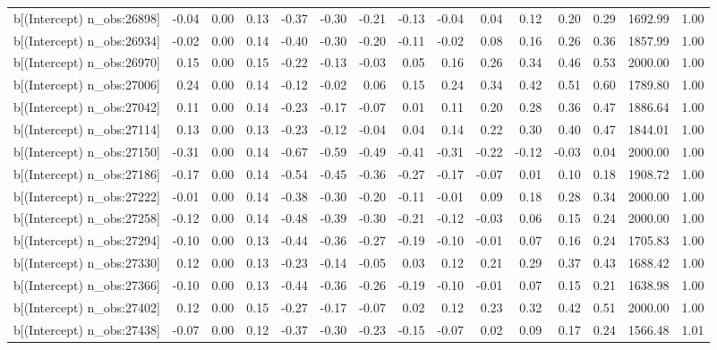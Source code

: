 \begin{table}[ht]
\begin{tabular}{rrrrrrrrrrrrrrr}
  b[(Intercept) n\_obs:26898] & -0.04 & 0.00 & 0.13 & -0.37 & -0.30 & -0.21 & -0.13 & -0.04 & 0.04 & 0.12 & 0.20 & 0.29 & 1692.99 & 1.00 \\ 
  b[(Intercept) n\_obs:26934] & -0.02 & 0.00 & 0.14 & -0.40 & -0.30 & -0.20 & -0.11 & -0.02 & 0.08 & 0.16 & 0.26 & 0.36 & 1857.99 & 1.00 \\ 
  b[(Intercept) n\_obs:26970] & 0.15 & 0.00 & 0.15 & -0.22 & -0.13 & -0.03 & 0.05 & 0.16 & 0.26 & 0.34 & 0.46 & 0.53 & 2000.00 & 1.00 \\ 
  b[(Intercept) n\_obs:27006] & 0.24 & 0.00 & 0.14 & -0.12 & -0.02 & 0.06 & 0.15 & 0.24 & 0.34 & 0.42 & 0.51 & 0.60 & 1789.80 & 1.00 \\ 
  b[(Intercept) n\_obs:27042] & 0.11 & 0.00 & 0.14 & -0.23 & -0.17 & -0.07 & 0.01 & 0.11 & 0.20 & 0.28 & 0.36 & 0.47 & 1886.64 & 1.00 \\ 
  b[(Intercept) n\_obs:27114] & 0.13 & 0.00 & 0.13 & -0.23 & -0.12 & -0.04 & 0.04 & 0.14 & 0.22 & 0.30 & 0.40 & 0.47 & 1844.01 & 1.00 \\ 
  b[(Intercept) n\_obs:27150] & -0.31 & 0.00 & 0.14 & -0.67 & -0.59 & -0.49 & -0.41 & -0.31 & -0.22 & -0.12 & -0.03 & 0.04 & 2000.00 & 1.00 \\ 
  b[(Intercept) n\_obs:27186] & -0.17 & 0.00 & 0.14 & -0.54 & -0.45 & -0.36 & -0.27 & -0.17 & -0.07 & 0.01 & 0.10 & 0.18 & 1908.72 & 1.00 \\ 
  b[(Intercept) n\_obs:27222] & -0.01 & 0.00 & 0.14 & -0.38 & -0.30 & -0.20 & -0.11 & -0.01 & 0.09 & 0.18 & 0.28 & 0.34 & 2000.00 & 1.00 \\ 
  b[(Intercept) n\_obs:27258] & -0.12 & 0.00 & 0.14 & -0.48 & -0.39 & -0.30 & -0.21 & -0.12 & -0.03 & 0.06 & 0.15 & 0.24 & 2000.00 & 1.00 \\ 
  b[(Intercept) n\_obs:27294] & -0.10 & 0.00 & 0.13 & -0.44 & -0.36 & -0.27 & -0.19 & -0.10 & -0.01 & 0.07 & 0.16 & 0.24 & 1705.83 & 1.00 \\ 
  b[(Intercept) n\_obs:27330] & 0.12 & 0.00 & 0.13 & -0.23 & -0.14 & -0.05 & 0.03 & 0.12 & 0.21 & 0.29 & 0.37 & 0.43 & 1688.42 & 1.00 \\ 
  b[(Intercept) n\_obs:27366] & -0.10 & 0.00 & 0.13 & -0.44 & -0.36 & -0.26 & -0.19 & -0.10 & -0.01 & 0.07 & 0.15 & 0.21 & 1638.98 & 1.00 \\ 
  b[(Intercept) n\_obs:27402] & 0.12 & 0.00 & 0.15 & -0.27 & -0.17 & -0.07 & 0.02 & 0.12 & 0.23 & 0.32 & 0.42 & 0.51 & 2000.00 & 1.00 \\ 
  b[(Intercept) n\_obs:27438] & -0.07 & 0.00 & 0.12 & -0.37 & -0.30 & -0.23 & -0.15 & -0.07 & 0.02 & 0.09 & 0.17 & 0.24 & 1566.48 & 1.01 \\ 

\end{tabular}
\end{table}

